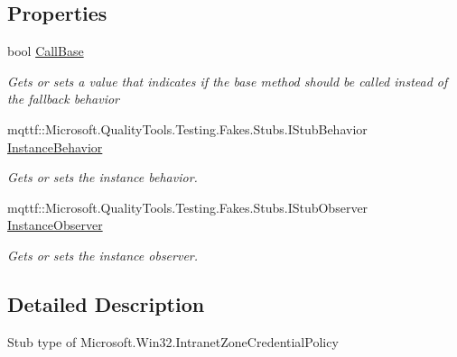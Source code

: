 \subsection*{Properties}
\begin{DoxyCompactItemize}
\item 
bool \hyperlink{class_microsoft_1_1_win32_1_1_fakes_1_1_stub_intranet_zone_credential_policy_a594310d5fe7b9fcf55b61f604d88e42e}{Call\-Base}
\begin{DoxyCompactList}\small\item\em Gets or sets a value that indicates if the base method should be called instead of the fallback behavior\end{DoxyCompactList}\item 
mqttf\-::\-Microsoft.\-Quality\-Tools.\-Testing.\-Fakes.\-Stubs.\-I\-Stub\-Behavior \hyperlink{class_microsoft_1_1_win32_1_1_fakes_1_1_stub_intranet_zone_credential_policy_a3c3933d137deaa83e86006dbc70e7acf}{Instance\-Behavior}
\begin{DoxyCompactList}\small\item\em Gets or sets the instance behavior.\end{DoxyCompactList}\item 
mqttf\-::\-Microsoft.\-Quality\-Tools.\-Testing.\-Fakes.\-Stubs.\-I\-Stub\-Observer \hyperlink{class_microsoft_1_1_win32_1_1_fakes_1_1_stub_intranet_zone_credential_policy_a09aa4415b6207726189d253e3d7bac12}{Instance\-Observer}
\begin{DoxyCompactList}\small\item\em Gets or sets the instance observer.\end{DoxyCompactList}\end{DoxyCompactItemize}


\subsection{Detailed Description}
Stub type of Microsoft.\-Win32.\-Intranet\-Zone\-Credential\-Policy



